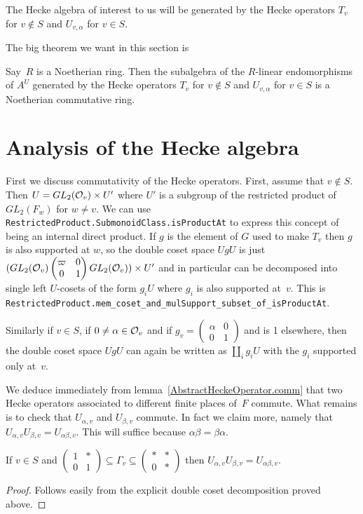 The Hecke algebra of interest to us will be generated by the Hecke operators $T_v$ for $v\notin S$
and $U_{v,\alpha}$ for $v\in S$.

The big theorem we want in this section is
\begin{theorem}
  \label{nolean-hecke-algebra-commutative-noetherian}
  Say~$R$ is a Noetherian ring. Then the subalgebra of the $R$-linear endomorphisms
  of $A^U$ generated by the Hecke operators $T_v$ for $v\notin S$ and $U_{v,\alpha}$ for $v\in S$
  is a Noetherian commutative ring.
\end{theorem}

\section{Analysis of the Hecke algebra}

First we discuss commutativity of the Hecke operators. First, assume that $v\not\in S$.
Then $U=GL_2(\mathcal{O}_v)\times U'$ where $U'$ is a subgroup of the restricted product
of $GL_2(F_w)$ for $w\not=v$. We can use {\tt RestrictedProduct.SubmonoidClass.isProductAt} to express this
concept of being an internal direct product. If $g$ is the element of $G$ used to make $T_v$ then
$g$ is also supported at $w$, so the double coset space $UgU$ is just
$(GL_2(\mathcal{O}_v)\begin{pmatrix}\varpi&0\\0&1\end{pmatrix}GL_2(\mathcal{O}_v))\times U'$
and in particular can be decomposed into single left $U$-cosets of the form $g_iU$
where $g_i$ is also supported at~$v$. This is {\tt RestrictedProduct.mem\_coset\_and\_mulSupport\_subset\_of\_isProductAt}.

Similarly if $v\in S$, if $0\not=\alpha\in\mathcal{O}_v$ and if $g_v=\begin{pmatrix}\alpha&0\\0&1\end{pmatrix}$
and is 1 elsewhere, then the double coset space $UgU$ can again be written as $\coprod_i g_iU$
with the $g_i$ supported only at~$v$.

We deduce immediately from lemma~\ref{AbstractHeckeOperator.comm} that two Hecke operators
associated to different finite places of~$F$ commute.
What remains is to check that $U_{\alpha,v}$ and $U_{\beta,v}$ commute. In fact we claim
more, namely that $U_{\alpha,v}U_{\beta,v}=U_{\alpha\beta,v}$. This will suffice
because $\alpha\beta=\beta\alpha$.

\begin{lemma}
  \label{nolean-product-of-U-alpha}
  If $v\in S$ and $\begin{pmatrix}1&*\\0&1\end{pmatrix}\subseteq\Gamma_v\subseteq\begin{pmatrix}*&*\\0&*\end{pmatrix}$
  then $U_{\alpha,v}U_{\beta,v}=U_{\alpha\beta,v}$.
\end{lemma}
\begin{proof} Follows easily from the explicit double coset decomposition proved above.
\end{proof}

